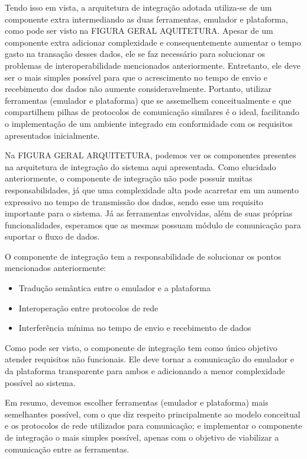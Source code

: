 Tendo isso em vista, a arquitetura de integração adotada utiliza-se de um componente extra intermediando as duas ferramentas, emulador e plataforma, como pode ser visto na
FIGURA GERAL AQUITETURA.
Apesar de um componente extra adicionar complexidade e consequentemente aumentar o tempo gasto na transação desses dados, ele se faz necessário para solucionar os problemas
de interoperabilidade mencionados anteriormente.
Entretanto, ele deve ser o mais simples possível para que o acrescimento no tempo de envio e recebimento dos dados não aumente consideravelmente.
Portanto, utilizar ferramentas (emulador e plataforma) que se assemelhem conceitualmente e que compartilhem pilhas de protocolos de comunicação similares é o ideal,
facilitando o implementação de um ambiente integrado em conformidade com os requisitos apresentados inicialmente.

Na FIGURA GERAL ARQUITETURA, podemos ver os componentes presentes na arquitetura de integração do sistema aqui apresentada.
Como elucidado anteriormente, o componente de integração não pode possuir muitas responsabilidades, já que uma complexidade alta pode acarretar em um aumento expressivo no
tempo de transmissão dos dados, sendo esse um requisito importante para o sistema.
Já as ferramentas envolvidas, além de suas próprias funcionalidades, esperamos que as mesmas possuam módulo de comunicação para suportar o fluxo de dados.

O componente de integração tem a responsabilidade de solucionar os pontos mencionados anteriormente:

\begin{itemize}
    \item Tradução semântica entre o emulador e a plataforma

    \item Interoperação entre protocolos de rede

    \item Interferência mínima no tempo de envio e recebimento de dados
\end{itemize}

Como pode ser visto, o componente de integração tem como único objetivo atender requisitos não funcionais.
Ele deve tornar a comunicação do emulador e da plataforma transparente para ambos e adicionando a menor complexidade possível ao sistema.

Em resumo, devemos escolher ferramentas (emulador e plataforma) mais semelhantes possível, com o que diz respeito principalmente ao modelo conceitual e os protocolos de
rede utilizados para comunicação; e implementar o componente de integração o mais simples possível, apenas com o objetivo de viabilizar a comunicação entre as ferramentas.


